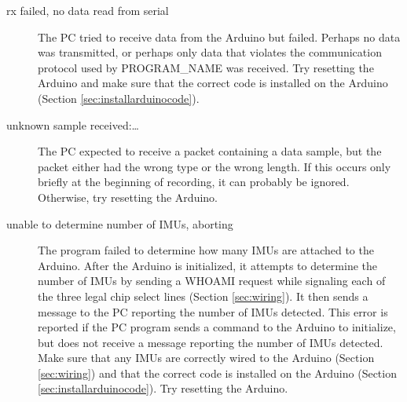 \documentclass[11pt,letterpaper,article,oneside]{memoir}
\newcommand{\name}{PROGRAM\_NAME}
\begin{document}
\begin{description}
\item[rx failed, no data read from serial]
The PC tried to receive data from the Arduino but failed. Perhaps no data was
transmitted, or perhaps only data that violates the communication protocol used
by \name{} was received. Try resetting the Arduino and make sure that the
correct code is installed on the Arduino (Section \ref{sec:installarduinocode}).

\item[unknown sample received:\dots]
The PC expected to receive a packet containing a data sample, but the packet
either had the wrong type or the wrong length. If this occurs only briefly at
the beginning of recording, it can probably be ignored. Otherwise, try resetting
the Arduino.

\item[unable to determine number of IMUs, aborting]
The program failed to determine how many IMUs are attached to the Arduino. After
the Arduino is initialized, it attempts to determine the number of IMUs by
sending a WHOAMI request while signaling each of the three legal chip select
lines (Section \ref{sec:wiring}). It then sends a message to the PC reporting the
number of IMUs detected. This error is reported if the PC program sends a
command to the Arduino to initialize, but does not receive a message reporting
the number of IMUs detected. Make sure that any IMUs are correctly wired to the
Arduino (Section \ref{sec:wiring}) and that the correct code is installed on the
Arduino (Section \ref{sec:installarduinocode}). Try resetting the Arduino.



\end{description}
\end{document}
